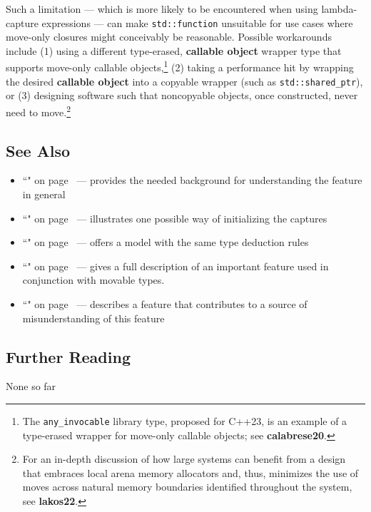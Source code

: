 \noindent Such a limitation --- which is more likely to be encountered when using
lambda-capture expressions --- can make \texttt{std::function}
unsuitable for use cases where move-only closures might conceivably be
reasonable. Possible workarounds include (1) using a different
type-erased, \textbf{callable object} wrapper type that supports
move-only callable objects,{\cprotect\footnote{The
\texttt{any\_invocable} library type, proposed for C++23, is an
example of a type-erased wrapper for move-only callable objects; see
\textbf{calabrese20}.}} (2) taking a performance hit by wrapping the
desired \textbf{callable object} into a copyable wrapper (such as
\texttt{std::shared\_ptr}), or (3) designing software such that
noncopyable objects, once constructed, never need to
move.\footnote{For an in-depth discussion of how large systems can
benefit from a design that embraces local arena memory allocators and,
thus, minimizes the use of moves across natural memory boundaries
identified throughout the system, see \textbf{lakos22}.}

\subsection[See Also]{See Also}\label{see-also}

\begin{itemize}
\item{``" on page~\pageref{lambda} — provides the needed background for understanding the feature in general}
\item{``" on page~\pageref{bracedinit} — illustrates one possible way of initializing the captures}
\item{``" on page~\pageref{auto-feature} — offers a model with the same type deduction rules}
\item{``" on page~\pageref{Rvalue-References} — gives a full description of an important feature used in conjunction with movable types.}
\item{``" on page~\pageref{forwardingref} — describes a feature that contributes to a source of misunderstanding of this feature}
\end{itemize}

\subsection[Further Reading]{Further Reading}\label{further-reading}

None so far


